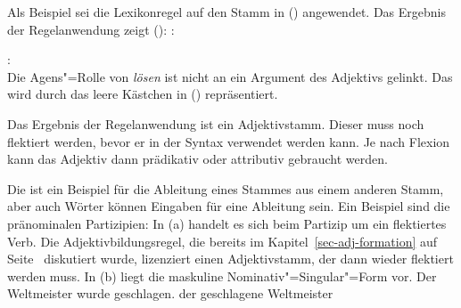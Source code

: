 \newpage
\noindent
Als Beispiel sei die Lexikonregel auf den Stamm  in ()
angewendet. Das Ergebnis der Regelanwendung zeigt ():
\eas
\mbox{:}\\
\zs{}

\noindent
\eas
\label{le-fahrbar}
:\\
\zs
Die Agens"=Rolle von \emph{lösen} ist nicht an ein Argument des
Adjektivs gelinkt. Das wird durch das leere Kästchen in ()
repräsentiert.

Das Ergebnis der Regelanwendung ist ein Adjektivstamm. Dieser muss noch flektiert werden, 
bevor er in der Syntax verwendet werden kann. Je nach Flexion kann das Adjektiv dann
prädikativ oder attributiv gebraucht werden.

Die \bard ist ein Beispiel für die Ableitung eines Stammes aus einem anderen Stamm, aber auch Wörter
können Eingaben für eine Ableitung sein. Ein Beispiel sind die pränominalen Partizipien: In (a) handelt es sich
beim Partizip um ein flektiertes Verb. Die Adjektivbildungsregel, die bereits im Kapitel~\ref{sec-adj-formation}
auf Seite~\pageref{lr-adjective-formation-da-approach} diskutiert wurde, lizenziert einen Adjektivstamm, der dann wieder
flektiert werden muss. In (b) liegt die maskuline Nominativ"=Singular"=Form vor.
\eal
\ex Der Weltmeister wurde geschlagen.
\ex der geschlagene Weltmeister
\zl
{}


